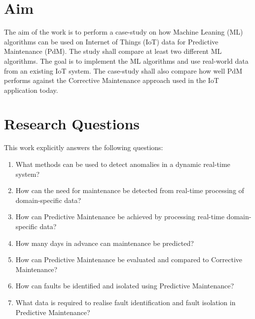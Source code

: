 \section{Aim}
\label{sec:aim}
The aim of the work is to perform a case-study on how Machine Leaning (ML) algorithms can be used on Internet of Things (IoT) data for Predictive Maintenance (PdM).
The study shall compare at least two different ML algorithms.
The goal is to implement the ML algorithms and use real-world data from an existing IoT system.
The case-study shall also compare how well PdM performs against the Corrective Maintenance approach used in the IoT application today.


\section{Research Questions}
\label{sec:research-questions}
This work explicitly answers the following questions:
\begin{enumerate}
  \item What methods can be used to detect anomalies in a dynamic real-time system?
  \item How can the need for maintenance be detected from real-time processing of domain-specific data?
  \item How can Predictive Maintenance be achieved by processing real-time domain-specific data?
  \item How many days in advance can maintenance be predicted?
  \item How can Predictive Maintenance be evaluated and compared to Corrective Maintenance?
  \item How can faults be identified and isolated using Predictive Maintenance?
  \item What data is required to realise fault identification and fault isolation in Predictive Maintenance?
\end{enumerate}

